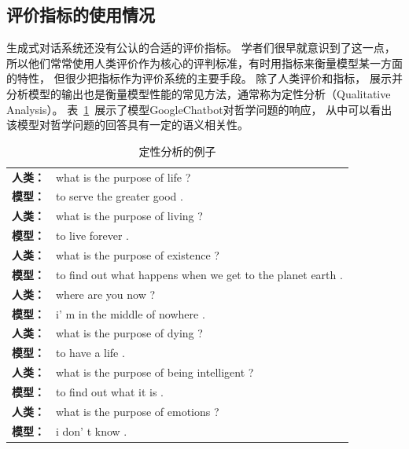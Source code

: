 \subsection{评价指标的使用情况}\label{subsec:metrics_usage}
生成式对话系统还没有公认的合适的评价指标。
学者们很早就意识到了这一点，
所以他们常常使用人类评价作为核心的评判标准，有时用指标来衡量模型某一方面的特性，
但很少把指标作为评价系统的主要手段。
除了人类评价和指标，
展示并分析模型的输出也是衡量模型性能的常见方法，通常称为定性分析（Qualitative Analysis）。
表~\ref{tab:qualitative_analysis}~展示了模型GoogleChatbot对哲学问题的响应，
从中可以看出该模型对哲学问题的回答具有一定的语义相关性。
\begin{table}
    \centering
    \caption{定性分析的例子}
    \label{tab:qualitative_analysis}
    \begin{tabular}{ll}
        \toprule
        \midrule
        \textbf{人类：} & what is the purpose of life ? \\
        \textbf{模型：} & to serve the greater good .\\
        \midrule
        \textbf{人类：} & what is the purpose of living ? \\
        \textbf{模型：} & to live forever . \\
        \midrule
        \textbf{人类：} & what is the purpose of existence ? \\
        \textbf{模型：} & to find out what happens when we get to the planet earth . \\
        \midrule
        \textbf{人类：} & where are you now ? \\
        \textbf{模型：} & i' m in the middle of nowhere . \\
        \midrule
        \textbf{人类：} & what is the purpose of dying ? \\
        \textbf{模型：} & to have a life . \\
        \midrule
        \textbf{人类：} & what is the purpose of being intelligent ? \\
        \textbf{模型：} & to find out what it is . \\
        \midrule
        \textbf{人类：} & what is the purpose of emotions ? \\
        \textbf{模型：} & i don' t know . \\
        \bottomrule
    \end{tabular}
\end{table}

